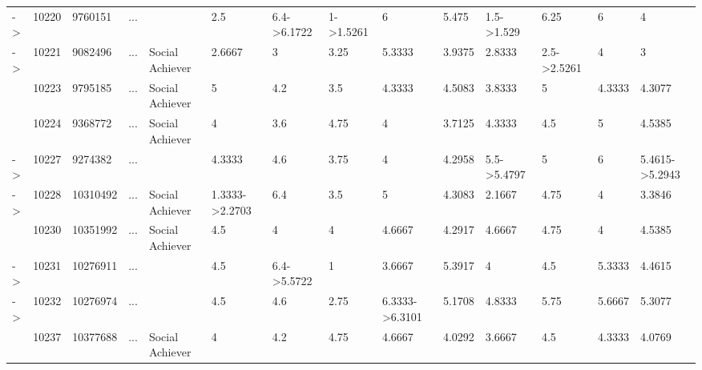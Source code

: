 \documentclass[6pt,a4paper]{article}
\begin{document}
\begin{landscape}
{\begin{longtable}{llllllllllllll}
-\textgreater &10220&9760151&...&&2.5&6.4-\textgreater 6.1722&1-\textgreater 1.5261&6&5.475&1.5-\textgreater 1.529&6.25&6&4\tabularnewline
-\textgreater &10221&9082496&...&Social Achiever&2.6667&3&3.25&5.3333&3.9375&2.8333&2.5-\textgreater 2.5261&4&3\tabularnewline
&10223&9795185&...&Social Achiever&5&4.2&3.5&4.3333&4.5083&3.8333&5&4.3333&4.3077\tabularnewline
&10224&9368772&...&Social Achiever&4&3.6&4.75&4&3.7125&4.3333&4.5&5&4.5385\tabularnewline
-\textgreater &10227&9274382&...&&4.3333&4.6&3.75&4&4.2958&5.5-\textgreater 5.4797&5&6&5.4615-\textgreater 5.2943\tabularnewline
-\textgreater &10228&10310492&...&Social Achiever&1.3333-\textgreater 2.2703&6.4&3.5&5&4.3083&2.1667&4.75&4&3.3846\tabularnewline
&10230&10351992&...&Social Achiever&4.5&4&4&4.6667&4.2917&4.6667&4.75&4&4.5385\tabularnewline
-\textgreater &10231&10276911&...&&4.5&6.4-\textgreater 5.5722&1&3.6667&5.3917&4&4.5&5.3333&4.4615\tabularnewline
-\textgreater &10232&10276974&...&&4.5&4.6&2.75&6.3333-\textgreater 6.3101&5.1708&4.8333&5.75&5.6667&5.3077\tabularnewline
&10237&10377688&...&Social Achiever&4&4.2&4.75&4.6667&4.0292&3.6667&4.5&4.3333&4.0769\tabularnewline
\hline
\end{longtable}}

\end{landscape}
\end{document}
